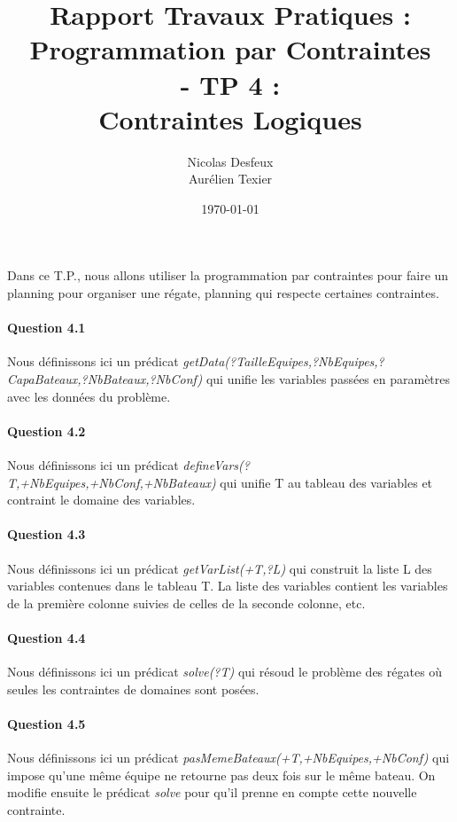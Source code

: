 \documentclass[11pt]{article} %
\date{\today}
\title{Rapport Travaux Pratiques : \\Programmation par Contraintes\\ - TP 4 : \\\textbf{Contraintes Logiques}}
\author{Nicolas Desfeux\\Aurélien Texier}
\begin{document}
\lstset{language=Prolog,breaklines=true,numbers=left,basicstyle=\footnotesize ,numberstyle=\footnotesize}
\maketitle
\paragraph{} Dans ce T.P., nous allons utiliser la programmation par contraintes pour faire un planning pour organiser une régate, planning qui respecte certaines contraintes.

\paragraph{Question 4.1}
Nous définissons ici un prédicat \textit{getData(?TailleEquipes,?NbEquipes,?CapaBateaux,?NbBateaux,?NbConf)} qui unifie les variables passées en paramètres avec les données du problème.


\paragraph{Question 4.2}
Nous définissons ici un prédicat \textit{defineVars(?T,+NbEquipes,+NbConf,+NbBateaux)} qui unifie T au tableau des variables et contraint le domaine des variables.


\paragraph{Question 4.3}
Nous définissons ici un prédicat \textit{getVarList(+T,?L)} qui construit la liste L des variables contenues dans le tableau T. La liste des variables contient les variables de la première colonne suivies de celles de la seconde colonne, etc.


\paragraph{Question 4.4}
Nous définissons ici un prédicat \textit{solve(?T)} qui résoud le problème des régates où seules les contraintes de domaines sont posées.


\paragraph{Question 4.5}
Nous définissons ici un prédicat \textit{pasMemeBateaux(+T,+NbEquipes,+NbConf)} qui impose qu'une même équipe ne retourne pas deux fois sur le même bateau. On modifie ensuite le prédicat \textit{solve} pour qu'il prenne en compte cette nouvelle contrainte.

\end{document}
